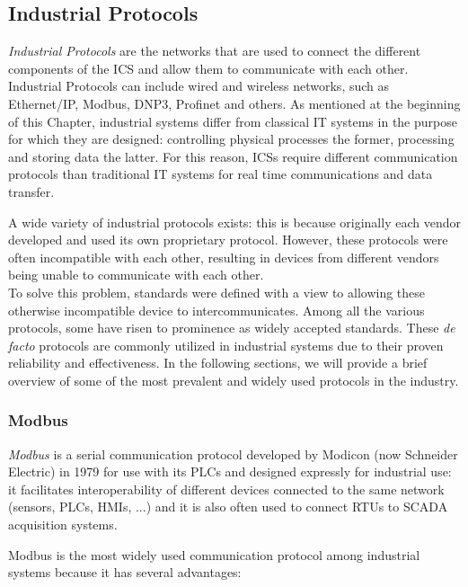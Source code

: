 \subsection{Industrial Protocols}
\label{subsec:2_ot_communication_networks}
\textit{Industrial Protocols} are the networks that are used to connect the different components of the ICS and allow them to communicate with each other. Industrial Protocols can include wired and wireless networks, such as Ethernet/IP, Modbus, DNP3, Profinet and others.\newline
As mentioned at the beginning of this Chapter, industrial systems differ from classical IT systems in the purpose for which they are designed: controlling physical processes the former, processing and storing data the latter. For this reason, ICSs require different communication protocols than traditional IT systems for real time communications and data transfer.

\bigskip
A wide variety of industrial protocols exists: this is because originally each vendor developed and used its own proprietary protocol. However, these protocols were often incompatible with each other, resulting in devices from different vendors being unable to communicate with each other.
\\To solve this problem, standards were defined with a view to allowing these otherwise incompatible device to intercommunicates.\newline
Among all the various protocols, some have risen to prominence as widely accepted standards. These \textit{de facto} protocols are commonly utilized in industrial systems due to their proven reliability and effectiveness. In the following sections, we will provide a brief overview of some of the most prevalent and widely used protocols in the industry.
\vfill

\subsubsection{Modbus}
\label{subsubsec:2_modbus}
\textit{Modbus} is a serial communication protocol developed by Modicon (now Schneider Electric) in 1979 for use with its PLCs \cite{Modbus_definition} and designed expressly for industrial use: it facilitates interoperability of different devices connected to the same network (sensors, PLCs, HMIs, ...) and it is also often used to connect RTUs to SCADA acquisition systems.

\bigskip
Modbus is the most widely used communication protocol among industrial systems because it has several advantages:

